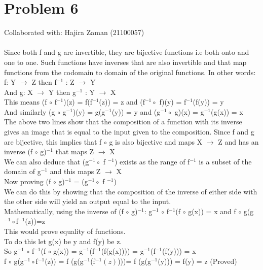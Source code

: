 \documentclass{article}
\begin{document}
\section{Problem 6}
Collaborated with: Hajira Zaman (21100057) \\ \\
Since both f and g are invertible, they are bijective functions i.e both onto and one to one. Such functions have inverses that are also invertible and that map functions from the codomain to domain of the original functions. In other words: \\
f: Y $\rightarrow$ Z then f$^{-1}$ : Z $\rightarrow$ Y \\
And g: X $\rightarrow$ Y then g$^{-1}$ : Y $\rightarrow$ X \\
This means (f $\circ$ f$^{-1}$)(z) = f(f$^{-1}$(z)) = z and (f$^{-1} \circ$ f)(y) = f$^{-1}$(f(y)) = y \\
And similarly (g $\circ$ g$^{-1}$)(y) = g(g$^{-1}$(y)) = y and (g$^{-1} \circ$ g)(x) = g$^{-1}$(g(x)) = x \\
The above two lines show that the composition of a function with its inverse gives an image that is equal to the input given to the composition. 
Since f and g are bijective, this implies that f $\circ$ g is also bijective and maps X $\rightarrow$ Z and has an inverse (f $\circ$ g)$^{-1}$ that maps Z $\rightarrow$ X \\
We can also deduce that (g$^{-1} \circ$ f $^{-1}$) exists as the range of f$^{-1}$ is a subset of the domain of g$^{-1}$ and this maps Z $\rightarrow$ X \\ 
Now proving (f $\circ$ g)$^{-1}$ = (g$^{-1} \circ$ f $^{-1}$)\\
We can do this by showing that the composition of the inverse of either side with the other side will yield an output equal to the input.\\ Mathematically, using the inverse of (f $\circ$ g)$^{-1}$: g$^{-1}$ $\circ$ f$^{-1}$(f $\circ$ g(x)) = x and f $\circ$ g(g$^{-1}\circ$f$^{-1}$(z))=z \\ This would prove equality of functions. \\ To do this let g(x) be y and f(y) be z. \\ So g$^{-1}$ $\circ$ f$^{-1}$(f $\circ$ g(x)) = g$^{-1}$(f$^{-1}$(f(g(x)))) = g$^{-1}$(f$^{-1}$(f(y))) = x \\
f $\circ$ g(g$^{-1}\circ$f$^{-1}$(z)) = f (g(g$^{-1}$(f$^{-1}(z)$)))= f (g(g$^{-1}$(y))) = f(y) = z (Proved)
\end{document}
